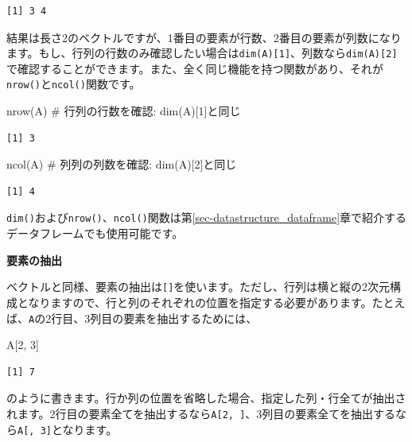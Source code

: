 \documentclass[
  a4paper,
  pandoc,
  ja=standard,
  jafont=haranoaji]{bxjsbook}
\newenvironment{Shaded}{\begin{snugshade}}{\end{snugshade}}
\newcommand{\CommentTok}[1]{\textcolor[rgb]{0.37,0.37,0.37}{#1}}
\newcommand{\DecValTok}[1]{\textcolor[rgb]{0.68,0.00,0.00}{#1}}
\newcommand{\FunctionTok}[1]{\textcolor[rgb]{0.28,0.35,0.67}{#1}}
\newcommand{\NormalTok}[1]{\textcolor[rgb]{0.00,0.48,0.65}{#1}}
\begin{document}
\begin{verbatim}
[1] 3 4
\end{verbatim}

結果は長さ2のベクトルですが、1番目の要素が行数、2番目の要素が列数になります。もし、行列の行数のみ確認したい場合は\texttt{dim(A){[}1{]}}、列数なら\texttt{dim(A){[}2{]}}で確認することができます。また、全く同じ機能を持つ関数があり、それが\texttt{nrow()}と\texttt{ncol()}関数です。

\begin{Shaded}
\begin{Highlighting}[numbers=left,,]
\FunctionTok{nrow}\NormalTok{(A) }\CommentTok{\# 行列の行数を確認: dim(A)[1]と同じ}
\end{Highlighting}
\end{Shaded}

\begin{verbatim}
[1] 3
\end{verbatim}

\begin{Shaded}
\begin{Highlighting}[numbers=left,,]
\FunctionTok{ncol}\NormalTok{(A) }\CommentTok{\# 列列の列数を確認: dim(A)[2]と同じ}
\end{Highlighting}
\end{Shaded}

\begin{verbatim}
[1] 4
\end{verbatim}

\texttt{dim()}および\texttt{nrow()}、\texttt{ncol()}関数は第\ref{sec-datastructure_dataframe}章で紹介するデータフレームでも使用可能です。

\textbf{要素の抽出}

ベクトルと同様、要素の抽出は\texttt{{[}{]}}を使います。ただし、行列は横と縦の2次元構成となりますので、行と列のそれぞれの位置を指定する必要があります。たとえば、\texttt{A}の2行目、3列目の要素を抽出するためには、

\begin{Shaded}
\begin{Highlighting}[numbers=left,,]
\NormalTok{A[}\DecValTok{2}\NormalTok{, }\DecValTok{3}\NormalTok{]}
\end{Highlighting}
\end{Shaded}

\begin{verbatim}
[1] 7
\end{verbatim}

のように書きます。行か列の位置を省略した場合、指定した列・行全てが抽出されます。2行目の要素全てを抽出するなら\texttt{A{[}2,\ {]}}、3列目の要素全てを抽出するなら\texttt{A{[},\ 3{]}}となります。
\end{document}
